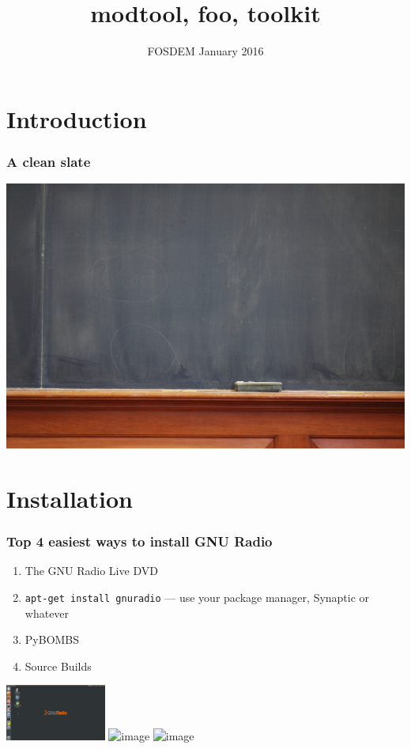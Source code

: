 \documentclass{beamer}
\title{modtool, foo, toolkit} %
\institute{Martin Braun, Ettus Research}
\date{FOSDEM January 2016}
\begin{document}
\frame{\titlepage}

\section{Introduction}

\begin{frame}
  \frametitle{A clean slate}
    \includegraphics[width=.9\textwidth]{clean_slate.jpg}
\end{frame}

\section{Installation}
\begin{frame}
  \frametitle{Top 4 easiest ways to install GNU Radio}
  \begin{enumerate}
    \item The GNU Radio Live DVD
    \item<2-> \texttt{apt-get install gnuradio} --- use your package manager, Synaptic or whatever
    \item<3-> PyBOMBS
    \item<4-> Source Builds
  \end{enumerate}
    \hspace{3em}
    \includegraphics[height=5em]{grlivedvd}
    \hspace{1em}
    \includegraphics<3->[height=5em]{pybombs_logo}
    \hspace{1em}
    \includegraphics<4->[height=5em]{srcbuild}
\end{frame}
\end{document}
